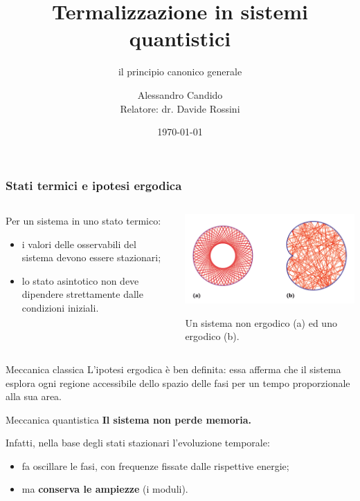 \documentclass[10pt]{beamer}
\title{Termalizzazione in sistemi quantistici}
\subtitle{il principio canonico generale}
\author[Alessandro Candido]{\texorpdfstring{Alessandro Candido\\Relatore: dr. Davide Rossini}{Alessandro Candido}}
\institute{}
\date{\today}
\theoremstyle{definition}
\theoremstyle{plain}
\begin{document}
\begin{frame}
	\maketitle
\end{frame}

\begin{frame}
	\frametitle{Stati termici e ipotesi ergodica}
	
	\begin{columns}
		\begin{column}{0.45\textwidth}
			Per un sistema in uno stato termico:
			\begin{itemize}[<+->]
				\item i valori delle osservabili del sistema devono essere stazionari;
				\item lo stato asintotico non deve dipendere strettamente dalle condizioni iniziali.
			\end{itemize}
		\end{column}
		\pause
		\begin{column}{0.55\textwidth}
			\centering
			\includegraphics[width=0.9\columnwidth]{./Images/ErgodicHypothesis.png}
			
			{\footnotesize Un sistema non ergodico (a) ed uno ergodico (b).}			
		\end{column}
	\end{columns}

	\begin{block}{Meccanica classica}
	L'ipotesi ergodica è ben definita: essa afferma che il sistema esplora ogni regione accessibile dello spazio delle fasi per un tempo proporzionale alla sua area.
	\end{block}
	\pause
	\begin{alertblock}{Meccanica quantistica}
	\textbf{Il sistema non perde memoria.}
	
	Infatti, nella base degli stati stazionari l'evoluzione temporale:
	\begin{itemize}[<+->]
		\item fa oscillare le fasi, con frequenze fissate dalle rispettive energie;
		\item ma \textbf{conserva le ampiezze} (i moduli).
	\end{itemize}
	\end{alertblock}
\end{frame}
\end{document}
